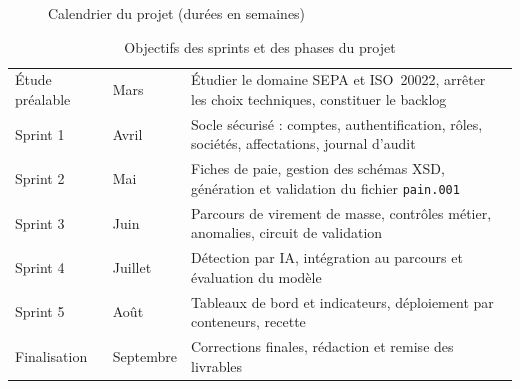 \begin{figure}[H]
\centering
{}
\caption{Calendrier du projet (durées en semaines)}
\label{fig:gantt}
\end{figure}

\begin{table}[H]
\centering
\small
\renewcommand{\arraystretch}{1.25}
\tablestyle
\begin{tabularx}{\textwidth}{|>{\raggedright\arraybackslash}p{2.6cm}|>{\raggedright\arraybackslash}p{2.6cm}|Y|}
\hline
{} &  &  \\
\hline
Étude préalable & Mars & Étudier le domaine SEPA et ISO~20022, arrêter les choix techniques, constituer le backlog \\
\hline
Sprint 1 & Avril & Socle sécurisé : comptes, authentification, rôles, sociétés, affectations, journal d'audit \\
\hline
Sprint 2 & Mai & Fiches de paie, gestion des schémas XSD, génération et validation du fichier \texttt{pain.001} \\
\hline
Sprint 3 & Juin & Parcours de virement de masse, contrôles métier, anomalies, circuit de validation \\
\hline
Sprint 4 & Juillet & Détection par IA, intégration au parcours et évaluation du modèle \\
\hline
Sprint 5 & Août & Tableaux de bord et indicateurs, déploiement par conteneurs, recette \\
\hline
Finalisation & Septembre & Corrections finales, rédaction et remise des livrables \\
\hline
\end{tabularx}
\caption{Objectifs des sprints et des phases du projet}
\label{tab:sprints}
\end{table}

